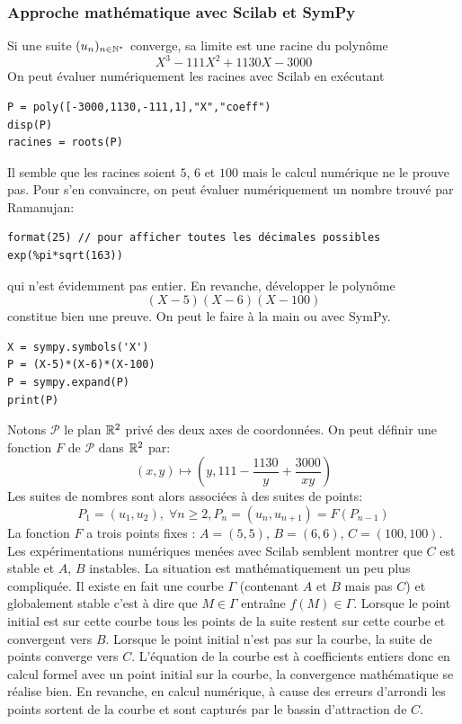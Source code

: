 \subsubsection{Approche mathématique avec Scilab et SymPy}
Si une suite $(u_n)_{n\in \mathbb{N}^*}$ converge, sa limite est une racine du polynôme
\begin{displaymath}
  X^3 - 111X^2+1130X-3000
\end{displaymath}
On peut évaluer numériquement les racines avec Scilab en exécutant
\begin{verbatim}
P = poly([-3000,1130,-111,1],"X","coeff")
disp(P)
racines = roots(P)  
\end{verbatim}
Il semble que les racines soient $5$, $6$ et $100$ mais le calcul numérique ne le prouve pas. Pour s'en convaincre, on peut évaluer numériquement un nombre trouvé par Ramanujan:
\begin{verbatim}
format(25) // pour afficher toutes les décimales possibles
exp(%pi*sqrt(163))  
\end{verbatim}
qui n'est évidemment pas entier. En revanche, développer le polynôme
\begin{displaymath}
  (X-5)(X-6)(X-100)
\end{displaymath}
constitue bien une preuve. On peut le faire à la main ou avec SymPy.
\begin{verbatim}
X = sympy.symbols('X')
P = (X-5)*(X-6)*(X-100)
P = sympy.expand(P)
print(P)
\end{verbatim}
Notons $\mathcal{P}$ le plan $\mathbb{R}^2$ privé des deux axes de coordonnées. On peut définir une fonction $F$ de $\mathcal{P}$ dans $\mathbb{R}^2$ par:
\begin{displaymath}
  (x,y)\mapsto (y, 111 - \frac{1130}{y} + \frac{3000}{xy})
\end{displaymath}
Les suites de nombres sont alors associées à des suites de points:
\begin{displaymath}
  P_1 = (u_1,u_2),\; \forall n\geq 2, P_n = (u_n,u_{n+1}) = F(P_{n-1})
\end{displaymath}
La fonction $F$ a trois points fixes : $A=(5,5)$, $B=(6,6)$, $C=(100,100)$. Les expérimentations numériques menées avec Scilab semblent montrer que $C$ est stable et $A$, $B$ instables. La situation est mathématiquement un peu plus compliquée. Il existe en fait une courbe $\Gamma$ (contenant $A$ et $B$ mais pas $C$) et globalement stable c'est à dire que $M\in \Gamma$ entraîne $f(M)\in \Gamma$. Lorsque le point initial est sur cette courbe tous les points de la suite restent sur cette courbe et convergent vers $B$. Lorsque le point initial n'est pas sur la courbe, la suite de points converge vers $C$. L'équation de la courbe est à coefficients entiers donc en calcul formel avec un point initial sur la courbe, la convergence mathématique se réalise bien. En revanche, en calcul numérique, à cause des erreurs d'arrondi les points sortent de la courbe et sont capturés par le bassin d'attraction de $C$.\newline
